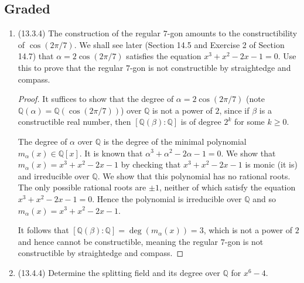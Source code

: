 \documentclass[11pt]{article}
\begin{document}
\subsection*{Graded}
\begin{enumerate}
    \item (13.3.4) The construction of the regular $7$-gon amounts to the constructibility of $\cos(2\pi/7)$. We shall see later (Section 14.5 and Exercise 2 of Section 14.7) that $\alpha = 2\cos(2\pi/7)$ satisfies the equation $x^3+x^2-2x-1 = 0$. Use this to prove that the regular $7$-gon is not constructible by straightedge and compass. \begin{proof}
        It suffices to show that the degree of $\alpha = 2\cos(2\pi/7)$ (note $\mathbb{Q}(\alpha) = \mathbb{Q}(\cos(2\pi/7))$) over $\mathbb{Q}$ is not a power of $2$, since if $\beta$ is a constructible real number, then $[\mathbb{Q}(\beta)\colon \mathbb{Q}]$ is of degree $2^k$ for some $k\geq 0$.

        The degree of $\alpha$ over $\mathbb{Q}$ is the degree of the minimal polynomial $m_\alpha(x)\in \mathbb{Q}[x]$. It is known that $\alpha^3+\alpha^2-2\alpha-1 = 0$. We show that $m_\alpha(x) = x^3+x^2-2x-1$ by checking that $x^3+x^2-2x-1$ is monic (it is) and irreducible over $\mathbb{Q}$. We show that this polynomial has no rational roots. The only possible rational roots are $\pm 1$, neither of which satisfy the equation $x^3+x^2-2x-1 = 0$. Hence the polynomial is irreducible over $\mathbb{Q}$ and so $m_\alpha(x) = x^3+x^2-2x-1$.

        It follows that $[\mathbb{Q}(\beta)\colon \mathbb{Q}] = \deg (m_\alpha(x)) = 3$, which is not a power of $2$ and hence cannot be constructible, meaning the regular $7$-gon is not constructible by straightedge and compass.
    \end{proof}
    \item (13.4.4) Determine the splitting field and its degree over $\mathbb{Q}$ for $x^6-4$.
    

\end{enumerate}
\end{document}

